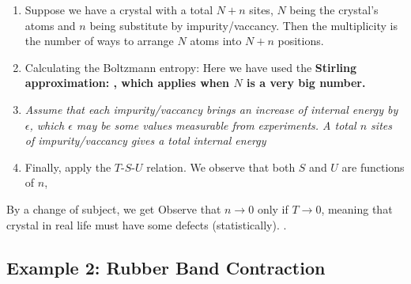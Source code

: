 \documentclass[class=article, crop=false, 12pt]{standalone}
\begin{document}
\begin{enumerate}
    \item Suppose we have a crystal with a total $N+n$ sites,
    $N$ being the crystal's atoms and $n$ being substitute by impurity/vaccancy.
    Then the multiplicity is the number of ways to arrange $N$ atoms into $N+n$ positions.

    \item Calculating the Boltzmann entropy:
    Here we have used the \bf{Stirling approximation}:
    , 
    which applies when $N$ is a very big number.

    \item \it{Assume} that each impurity/vaccancy brings an increase of internal energy by $\epsilon$,
    which $\epsilon$ may be some values measurable from experiments.
    A total $n$ sites of impurity/vaccancy gives a total internal energy 

    \item Finally, apply the $T$-$S$-$U$ relation.
    We observe that both $S$ and $U$ are functions of $n$,
\end{enumerate}

By a change of subject, we get
Observe that $n\to 0$ only if $T\to 0$,
meaning that crystal in real life must have some defects (statistically).
.


\subsection{Example 2: Rubber Band Contraction}
\end{document}
